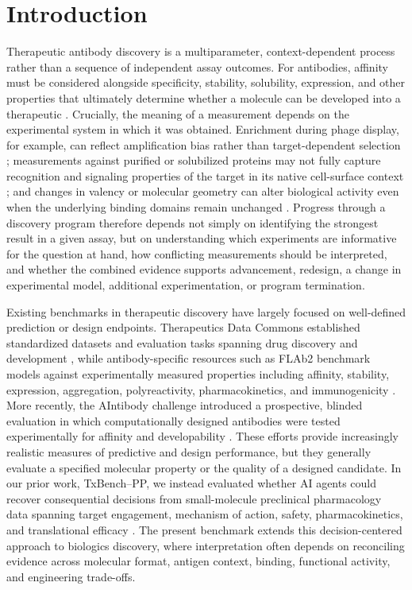 \documentclass[10pt,letterpaper]{article}
\begin{document}
{\fontsize{8.85}{12.0}\selectfont
\newcommand{\TwoColParaBreak}{\par\vspace{0.62em}\noindent}
\noindent\begin{minipage}[t]{0.47\textwidth}
\setlength{\parskip}{0pt}
\setlength{\parindent}{0pt}

\section{Introduction}

Therapeutic antibody discovery is a multiparameter, context-dependent process rather than a sequence of independent assay outcomes. For antibodies, affinity must be considered alongside specificity, stability, solubility, expression, and other properties that ultimately determine whether a molecule can be developed into a therapeutic \cite{Jain2017-ye}. Crucially, the meaning of a measurement depends on the experimental system in which it was obtained. Enrichment during phage display, for example, can reflect amplification bias rather than target-dependent selection \cite{Matochko2014-bw}; measurements against purified or solubilized proteins may not fully capture recognition and signaling properties of the target in its native cell-surface context \cite{Lacy2025-do}; and changes in valency or molecular geometry can alter biological activity even when the underlying binding domains remain unchanged \cite{Dickopf2020-to}. Progress through a discovery program therefore depends not simply on identifying the strongest result in a given assay, but on understanding which experiments are informative for the question at hand, how conflicting measurements should be interpreted, and whether the combined evidence supports advancement, redesign, a change in experimental model, additional experimentation, or program termination.
\TwoColParaBreak
Existing benchmarks in therapeutic discovery have largely focused on well-defined prediction or design endpoints. Therapeutics Data Commons established standardized datasets and evaluation tasks spanning drug discovery and development \cite{Huang2021-ei}, while antibody-specific resources such as FLAb2 benchmark models against experimentally measured properties including affinity, stability, expression, aggregation, polyreactivity, pharmacokinetics, and immunogenicity \cite{Chungyoun2025-co}. More recently, the AIntibody challenge introduced a prospective, blinded evaluation in which computationally designed antibodies were tested experimentally for affinity and developability \cite{Erasmus2026-qb}. These efforts provide increasingly realistic measures of predictive and design performance, but they generally evaluate a specified molecular property or the quality of a designed candidate. In our prior work, TxBench--PP, we instead evaluated whether AI agents could recover consequential decisions from small-molecule preclinical pharmacology data spanning target engagement, mechanism of action, safety, pharmacokinetics, and translational efficacy \cite{Le2026-tm}. The present benchmark extends this decision-centered approach to biologics discovery, where interpretation often depends on reconciling evidence across molecular format, antigen context, binding, functional activity, and engineering trade-offs.

\end{minipage}}
\end{document}

